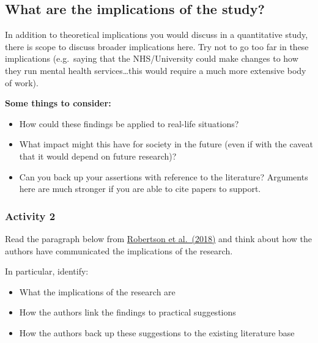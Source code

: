 \documentclass[
  english,
  letterpaper,
  DIV=11,
  numbers=noendperiod]{scrreprt}
\providecommand{\tightlist}{%
  \setlength{\itemsep}{0pt}\setlength{\parskip}{0pt}}
\begin{document}
\subsection{What are the implications of the
study?}\label{what-are-the-implications-of-the-study}

In addition to theoretical implications you would discuss in a
quantitative study, there is scope to discuss broader implications here.
Try not to go too far in these implications (e.g.~saying that the
NHS/University could make changes to how they run mental health
services\ldots this would require a much more extensive body of work).

\textbf{Some things to consider:}

\begin{itemize}
\tightlist
\item
  How could these findings be applied to real-life situations?
\item
  What impact might this have for society in the future (even if with
  the caveat that it would depend on future research)?
\item
  Can you back up your assertions with reference to the literature?
  Arguments here are much stronger if you are able to cite papers to
  support.
\end{itemize}

\subsubsection{Activity 2}\label{activity-2-1}

Read the paragraph below from
\href{https://www.sciencedirect.com/science/article/pii/S1750946717301277}{Robertson
et al.~(2018)} and think about how the authors have communicated the
implications of the research.

In particular, identify:

\begin{itemize}
\tightlist
\item
  What the implications of the research are
\item
  How the authors link the findings to practical suggestions
\item
  How the authors back up these suggestions to the existing literature
  base
\end{itemize}
\end{document}
